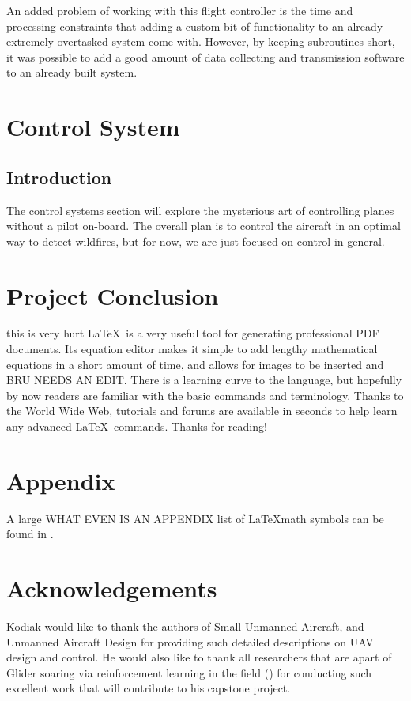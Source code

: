 \documentclass[12pt,journal,compsoc]{IEEEtran}
\begin{document}
An added problem of working with this flight controller is the time and processing constraints that adding a custom bit of functionality to an already extremely overtasked system come with. However, by keeping subroutines short, it was possible to add a good amount of data collecting and transmission software to an already built system.

\section{Control System}
\subsection{Introduction}
The control systems section will explore the mysterious art of controlling planes without a pilot on-board. The overall plan is to control the aircraft in an optimal way to detect wildfires, but for now, we are just focused on control in general.

\section{Project Conclusion} this is very hurt
\LaTeX\ is a very useful tool for generating professional PDF documents. Its equation editor makes it simple to add lengthy mathematical equations in a short amount of time, and allows for images to be inserted and BRU NEEDS AN EDIT. There is a learning curve to the language, but hopefully by now readers are familiar with the basic commands and terminology. Thanks to the World Wide Web, tutorials and forums are available in seconds to help learn any advanced \LaTeX\ commands. Thanks for reading!

\appendices
\section*{Appendix}
A large WHAT EVEN IS AN APPENDIX list of \LaTeX math symbols can be found in \cite{Symbols}.

\section*{Acknowledgements}
Kodiak would like to thank the authors of Small Unmanned Aircraft, and Unmanned Aircraft Design for providing such detailed descriptions on UAV design and control. He would also like to thank all researchers that are apart of Glider soaring via reinforcement learning in the field (\cite{GliderBirds}) for conducting such excellent work that will contribute to his capstone project.
\end{document}
